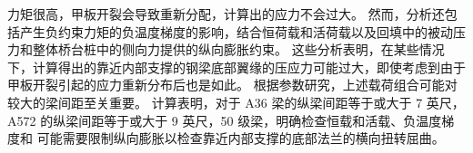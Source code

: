 力矩很高，甲板开裂会导致重新分配，计算出的应力不会过大。 然而，分析还包括产生负约束力矩的负温度梯度的影响，结合恒荷载和活荷载以及回填中的被动压力和整体桥台桩中的侧向力提供的纵向膨胀约束。 这些分析表明，在某些情况下，计算得出的靠近内部支撑的钢梁底部翼缘的压应力可能过大，即使考虑到由于甲板开裂引起的应力重新分布后也是如此。 根据参数研究，上述载荷组合可能对较大的梁间距至关重要。 计算表明，对于 A36 梁的纵梁间距等于或大于 7 英尺，A572 的纵梁间距等于或大于 9 英尺，50 级梁，明确检查恒载和活载、负温度梯度和 可能需要限制纵向膨胀以检查靠近内部支撑的底部法兰的横向扭转屈曲。

